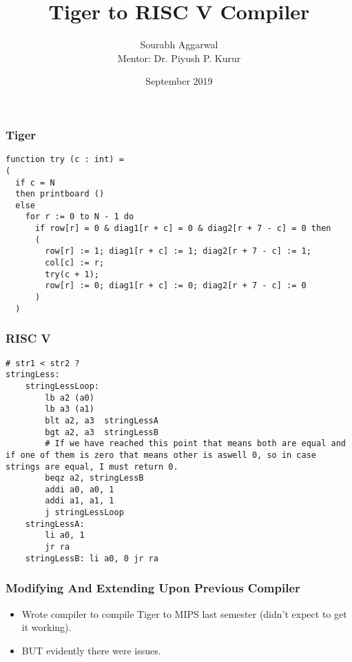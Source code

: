 \documentclass{beamer}
\title{Tiger to RISC V Compiler}
\author{Sourabh Aggarwal\\ Mentor: Dr. Piyush P. Kurur}
\institute[IIT Palakkad] %
{
  Department of Computer Science And Engineering\\
  IIT Palakkad
}
\date{September 2019}
\newcommand{\iph}[2]{
    \texttt{[image: \#2]}
}
\begin{document}
\begin{frame}
  \titlepage
\end{frame}

\begin{frame}[fragile]
  \frametitle{Tiger}
  \begin{verbatim}
function try (c : int) = 
( 
  if c = N
  then printboard ()
  else 
    for r := 0 to N - 1 do 
      if row[r] = 0 & diag1[r + c] = 0 & diag2[r + 7 - c] = 0 then 
      (
        row[r] := 1; diag1[r + c] := 1; diag2[r + 7 - c] := 1;
        col[c] := r;
        try(c + 1);
        row[r] := 0; diag1[r + c] := 0; diag2[r + 7 - c] := 0
      )
  )
  \end{verbatim}
\end{frame}

\begin{frame}[fragile]
  \frametitle{RISC V}
  \begin{verbatim}
# str1 < str2 ?
stringLess:
    stringLessLoop:
        lb a2 (a0)
        lb a3 (a1)
        blt a2, a3  stringLessA
        bgt a2, a3  stringLessB
        # If we have reached this point that means both are equal and if one of them is zero that means other is aswell 0, so in case strings are equal, I must return 0.
        beqz a2, stringLessB
        addi a0, a0, 1
        addi a1, a1, 1
        j stringLessLoop
    stringLessA:
        li a0, 1
        jr ra
    stringLessB: li a0, 0 jr ra 
  \end{verbatim}
\end{frame}

\begin{frame}[fragile]
  \frametitle{Modifying And Extending Upon Previous Compiler}
  \begin{itemize}
    \item Wrote compiler to compile Tiger to MIPS last semester (didn't expect to get it working). 
    \pause
    \item BUT evidently there were issues.
  \end{itemize}
\end{frame}
\end{document}
